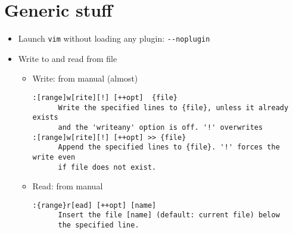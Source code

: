 \documentclass[a4paper,12pt,%
              final%
              ]{article}
\newcommand{\vim}{\texttt{vim}}
\begin{document}
\section{Generic stuff}
\begin{itemize}
  \item Launch \vim{} without loading any plugin: \verb|--noplugin|
  \item Write to and read from file
    \begin{itemize}
      \item Write: from manual (almost)
\begin{verbatim}
:[range]w[rite][!] [++opt]  {file}
      Write the specified lines to {file}, unless it already exists
      and the 'writeany' option is off. '!' overwrites
:[range]w[rite][!] [++opt] >> {file}
      Append the specified lines to {file}. '!' forces the write even
      if file does not exist.
\end{verbatim}
      \item Read: from manual
\begin{verbatim}
:{range}r[ead] [++opt] [name]
      Insert the file [name] (default: current file) below
      the specified line.


\end{verbatim}
\end{itemize}
\end{itemize}
\end{document}
